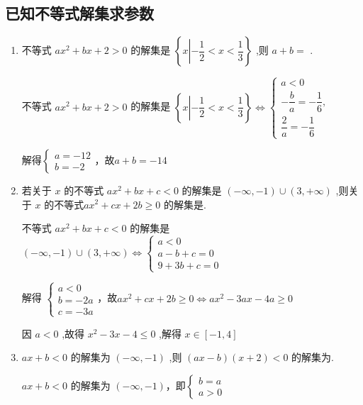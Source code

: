 \subsection*{已知不等式解集求参数}
\begin{enumerate}
    \item 不等式 $a{x}^{2} + {bx} + 2 > 0$ 的解集是 $\left\{  {x\left| { - \dfrac{1}{2} < x < \dfrac{1}{3}}\right. }\right\}$ ,则 $a + b =$ .
    \begin{jieda}
        不等式 $a{x}^{2} + {bx} + 2 > 0$ 的解集是 $\left\{  {x\left| { - \dfrac{1}{2} < x < \dfrac{1}{3}}\right. }\right\} \Longleftrightarrow \left\{  \begin{array}{l} a < 0 \\   - \dfrac{b}{a} =  - \dfrac{1}{6}, \\  \dfrac{2}{a} =  - \dfrac{1}{6} \end{array}\right.$ 
        
        解得$\left\{  {\begin{array}{l} a =  - {12} \\  b =  - 2 \end{array}}\right.$，故$a + b =  - {14}$
    \end{jieda}
    \item 若关于 $x$ 的不等式 $a{x}^{2} + {bx} + c < 0$ 的解集是 $\left( {-\infty , - 1}\right)  \cup  \left( {3, + \infty }\right)$ ,则关于 $x$ 的不等式$a{x}^{2} + {cx} + {2b} \geq  0$ 的解集是.
    \begin{jieda}
        不等式 $a{x}^{2} + {bx} + c < 0$ 的解集是 $\left( {-\infty , - 1}\right)  \cup  \left( {3, + \infty }\right) \Longleftrightarrow \left\{  \begin{array}{l}  
        a < 0 \\
        a-b+c = 0 \\  
        9+3b+c =  0 
        \end{array}\right.$
        
        解得 $\left\{\begin{array}{l}
             a < 0 \\
             b =  - {2a}  \\
             c =  - {3a} 
        \end{array}\right.$，故$a{x}^{2} + {cx} + {2b} \geq  0 \Longleftrightarrow a{x}^{2} - {3ax} - {4a} \geq  0$
        
        因 $a < 0$ ,故得 ${x}^{2} - {3x} - 4 \leq  0$ ,解得 $x \in \left\lbrack  {-1,4}\right\rbrack$
    \end{jieda}
    \item ${ax} + b < 0$ 的解集为 $\left( {-\infty , - 1}\right)$ ,则 $\left( {{ax} - b}\right) \left( {x + 2}\right)  < 0$ 的解集为.
    \begin{jieda}
         ${ax} + b < 0$ 的解集为 $\left( {-\infty , - 1}\right)$，即$\left\{\begin{array}{l}
              b = a  \\
              a > 0
         \end{array}\right.$


\end{jieda}
\end{enumerate}
